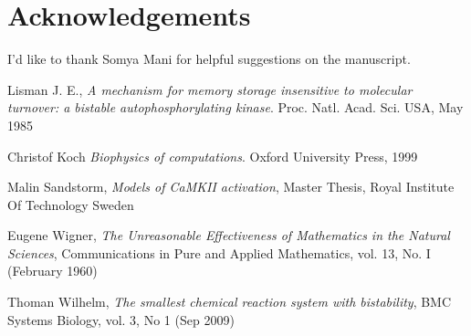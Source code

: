 \documentclass[]{resonance}
\begin{document}
\section*{Acknowledgements}
I'd like to thank Somya Mani for helpful suggestions on the manuscript.


\begin{thebibliography}{99} 
    Lisman J. E., 
    \textit{A mechanism for memory storage insensitive to molecular turnover: a
    bistable autophosphorylating kinase}. 
    Proc. Natl. Acad. Sci. USA, May 1985

    Christof Koch
    \textit{Biophysics of computations}.
    Oxford University Press, 1999

    Malin Sandstorm,
    \textit{Models of CaMKII activation},
    Master Thesis, Royal Institute Of Technology Sweden 

    Eugene Wigner,
    \textit{The Unreasonable Effectiveness of Mathematics in the Natural Sciences},
     Communications in Pure and Applied Mathematics, vol. 13, No. I (February 1960)

    Thoman Wilhelm,
    \textit{The smallest chemical reaction system with bistability},
    BMC Systems Biology, vol. 3, No 1 (Sep 2009)
\end{thebibliography}
\end{document}
